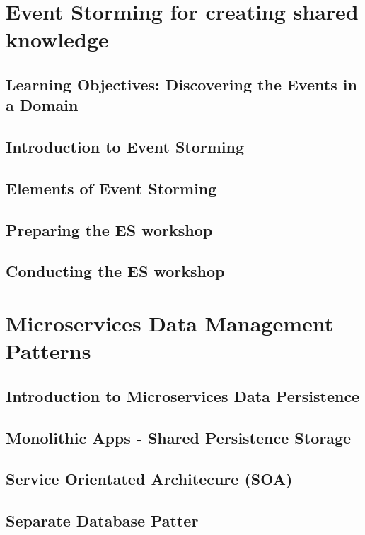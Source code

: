 \documentclass[a4paper, 11pt]{book}
\begin{document}
{    \chapter{Event Storming for creating shared knowledge}


    \section{Learning Objectives: Discovering the Events in a Domain}


    \section{Introduction to Event Storming}


    \section{Elements of Event Storming}


    \section{Preparing the ES workshop}


    \section{Conducting the ES workshop}


    \chapter{Microservices Data Management Patterns}


    \section{Introduction to Microservices Data Persistence}


    \section{Monolithic Apps - Shared Persistence Storage}


    \section{Service Orientated Architecure (SOA)}


    \section{Separate Database Patter}


}
\end{document}
